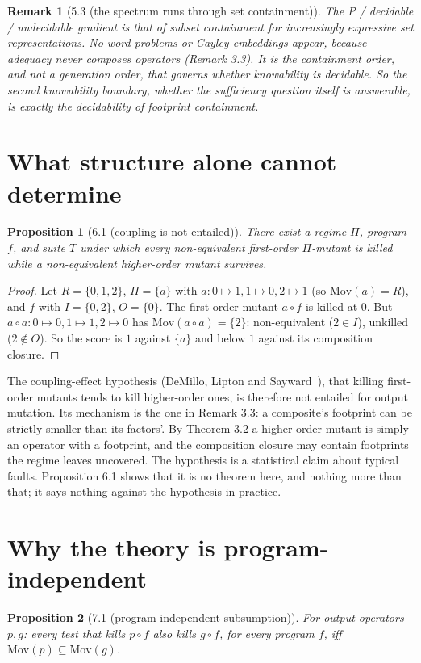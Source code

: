 \documentclass[conference]{IEEEtran}
\newcommand{\Mov}{\mathrm{Mov}}
\theoremstyle{run}
\newtheorem*{proposition}{Proposition}
\newtheorem*{remark}{Remark}
\begin{document}
\begin{remark}[5.3 (the spectrum runs through set containment)]
The P / decidable / undecidable gradient is that of subset containment for increasingly expressive set representations. No word problems or Cayley embeddings appear, because adequacy never composes operators (Remark 3.3). It is the containment order, and not a generation order, that governs whether knowability is decidable. So the second knowability boundary, whether the sufficiency question itself is answerable, is exactly the decidability of footprint containment.
\end{remark}

\setcounter{section}{5}
\section{What structure alone cannot determine}
\begin{proposition}[6.1 (coupling is not entailed)]
There exist a regime $\Pi$, program $f$, and suite $T$ under which every non-equivalent first-order $\Pi$-mutant is killed while a non-equivalent higher-order mutant survives.
\end{proposition}

\begin{proof}
Let $R = \{0,1,2\}$, $\Pi = \{a\}$ with $a: 0\mapsto 1, 1\mapsto 0, 2\mapsto 1$ (so $\Mov(a) = R$), and $f$ with $I = \{0,2\}$, $O = \{0\}$. The first-order mutant $a\circ f$ is killed at $0$. But $a\circ a: 0\mapsto 0, 1\mapsto 1, 2\mapsto 0$ has $\Mov(a\circ a) = \{2\}$: non-equivalent ($2\in I$), unkilled ($2\notin O$). So the score is $1$ against $\{a\}$ and below $1$ against its composition closure.
\end{proof}

The coupling-effect hypothesis (DeMillo, Lipton and Sayward~\cite{demillo1978}), that killing first-order mutants tends to kill higher-order ones, is therefore not entailed for output mutation. Its mechanism is the one in Remark 3.3: a composite's footprint can be strictly smaller than its factors'. By Theorem 3.2 a higher-order mutant is simply an operator with a footprint, and the composition closure may contain footprints the regime leaves uncovered. The hypothesis is a statistical claim about typical faults. Proposition 6.1 shows that it is no theorem here, and nothing more than that; it says nothing against the hypothesis in practice.

\setcounter{section}{6}
\section{Why the theory is program-independent}
\begin{proposition}[7.1 (program-independent subsumption)]
For output operators $p, g$: \emph{every test that kills $p\circ f$ also kills $g\circ f$, for every program $f$}, iff $\Mov(p) \subseteq \Mov(g)$.
\end{proposition}
\end{document}
